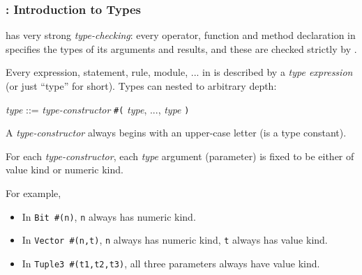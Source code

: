 \begin{frame}[fragile]
\frametitle{{\BSV}: Introduction to Types}

\footnotesize

{\BSV} has very strong \emph{type-checking}: every operator, function
and method declaration in {\BSV} specifies the types of its arguments and
results, and these are checked strictly by {\bsc}.

\PAUSE{\vspace{2ex}}

Every expression, statement, rule, module, ... in {\BSV} is described
by a \emph{type expression} (or just ``type'' for short).  Types can
nested to arbitrary depth:

\begin{tabbing}
 \hmmmm \emph{type} ::= \emph{type-constructor} {\tt \#(} \emph{type}, ..., \emph{type} {\tt )}
\end{tabbing}

\vspace{2ex}

A \emph{type-constructor} always begins with an upper-case letter (is a type constant).

\vspace{2ex}

For each \emph{type-constructor}, each \emph{type} argument
(parameter) is fixed to be either of value kind or numeric kind.

For example,

\begin{itemize}

 \item In \verb|Bit #(n)|, \verb|n| always has numeric kind.

 \item In \verb|Vector #(n,t)|, \verb|n| always has numeric kind,
 \verb|t| always has value kind.

 \item In \verb|Tuple3 #(t1,t2,t3)|, all three parameters always have value kind.

\end{itemize}

\end{frame}


